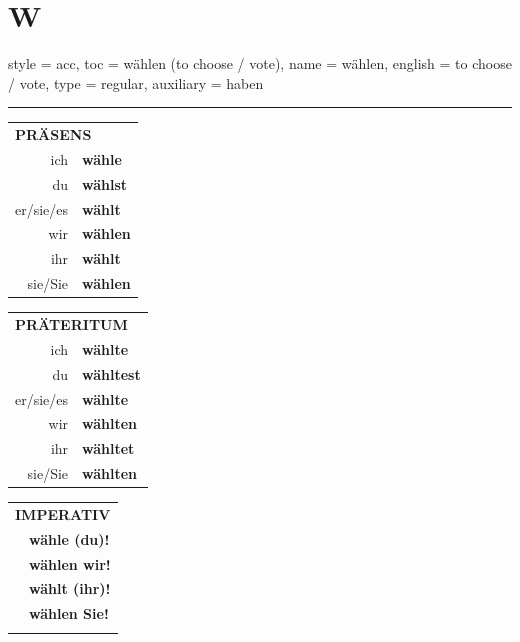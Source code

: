\section{W}

\begin{verbentry}{
  style = {acc},
  toc = {wählen (to choose / vote)},
  name = {wählen},
  english = {to choose / vote},
  type = {regular},
  auxiliary = {haben}
}
 
    
     \vspace{5pt}

    \hrule
    
    \vspace{5pt}

  \begin{tabular}{rl}
     \multicolumn{2}{l}{\textbf{PRÄSENS} }\\
    ich & \textbf{wähle}\\
    du & \textbf{wählst}\\
    er/sie/es & \textbf{wählt}\\
    wir & \textbf{wählen}\\
    ihr & \textbf{wählt}\\
    sie/Sie & \textbf{wählen}\\
  \end{tabular}
  \hfill
  \begin{tabular}{rl}
    \multicolumn{2}{l}{\textbf{PRÄTERITUM} }\\
    ich & \textbf{wählte}\\
    du & \textbf{wähltest}\\
    er/sie/es & \textbf{wählte}\\
    wir & \textbf{wählten}\\
    ihr & \textbf{wähltet}\\
    sie/Sie & \textbf{wählten}\\
  \end{tabular}
  \hfill
  \begin{tabular}{rl}
     \multicolumn{2}{l}{\textbf{IMPERATIV} }\\
   & \textbf{wähle (du)!}\\
   & \textbf{wählen wir!}\\
   & \textbf{wählt (ihr)!}\\
   & \textbf{wählen Sie!}\\
   & \vspace{10pt}
  \end{tabular}

 \vspace{10pt}


\end{verbentry}

